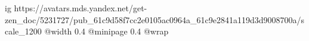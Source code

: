  
 
 
 
 

\ifcmt
  ig https://avatars.mds.yandex.net/get-zen_doc/5231727/pub_61c9d58f7cc2e0105ac0964a_61c9e2841a119d3d9008700a/scale_1200
  @width 0.4
  @minipage 0.4
  @wrap \parpic[r]
\fi
